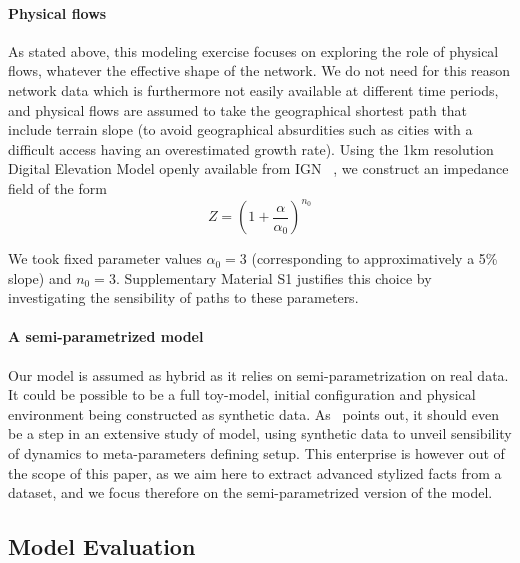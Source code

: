 \documentclass[Royal,sageh,times]{sagej}
\begin{document}
\paragraph{Physical flows}

As stated above, this modeling exercise focuses on exploring the role of physical flows, whatever the effective shape of the network. We do not need for this reason network data which is furthermore not easily available at different time periods, and physical flows are assumed to take the geographical shortest path that include terrain slope (to avoid geographical absurdities such as cities with a difficult access having an overestimated growth rate). Using the 1km resolution Digital Elevation Model openly available from IGN~\cite{}%
, we construct an impedance field of the form
\[
Z = \left(1 + \frac{\alpha}{\alpha_0}\right)^{n_0}
\]

We took fixed parameter values $\alpha_0 = 3$ (corresponding to approximatively a 5\% slope) and $n_0 = 3$. Supplementary Material S1 justifies this choice by investigating the sensibility of paths to these parameters.




\paragraph{A semi-parametrized model}

Our model is assumed as hybrid as it relies on semi-parametrization on real data. It could be possible to be a full toy-model, initial configuration and physical environment being constructed as synthetic data. As~\cite{raimbault2016generation} points out, it should even be a step in an extensive study of model, using synthetic data to unveil sensibility of dynamics to meta-parameters defining setup. This enterprise is however out of the scope of this paper, as we aim here to extract advanced stylized facts from a dataset, and we focus therefore on the semi-parametrized version of the model.



\subsection*{Model Evaluation}
\end{document}

